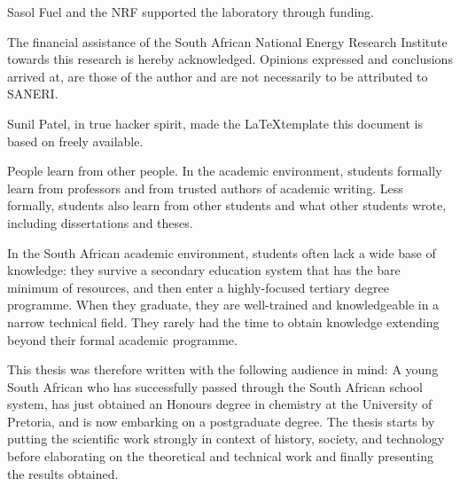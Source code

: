 \documentclass[
11pt, %
english, %
singlespacing, %
liststotoc, %
toctotoc, %
headsepline, %
]{MastersDoctoralThesis} %
\begin{document}
\begin{acknowledgements}
Sasol Fuel and the NRF supported the laboratory through funding.

The financial assistance of the South African National Energy Research Institute
towards this research is hereby acknowledged. Opinions expressed and conclusions
arrived at, are those of the author and are not necessarily to be attributed to
SANERI.

Sunil Patel, in true hacker spirit, made the \LaTeX template this document is
based on freely available.


\end{acknowledgements}


\begin{preface}
\addchaptertocentry{\prefacename}

People learn from other people. In the academic environment, students formally
learn from professors and from trusted authors of academic writing. Less
formally, students also learn from other students and what other students
wrote, including dissertations and theses.

In the South African academic environment, students often lack a wide base of
knowledge: they survive a secondary education system that has the bare minimum
of resources, and then enter a highly-focused tertiary degree programme. When
they graduate, they are well-trained and knowledgeable in a narrow technical
field. They rarely had the time to obtain knowledge extending beyond their
formal academic programme.

This thesis was therefore written with the following audience in mind: A young
South African who has successfully passed through the South African school
system, has just obtained an Honours degree in chemistry at the University of
Pretoria, and is now embarking on a postgraduate degree. The thesis starts by
putting the scientific work strongly in context of history, society, and
technology before elaborating on the theoretical and technical work and finally
presenting the results obtained.

\end{preface}

\end{document}
